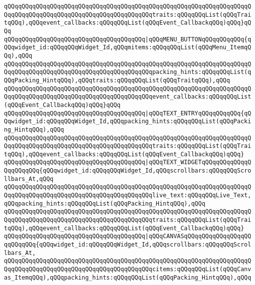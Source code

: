 \verb|qQQqqQQqqQQqqQQqqQQqqQQqqQQqqQQqqQQqqQQqqQQqqQQqqQQqqQQqqQQqqQQqqQQqqQQqqQQqqQQqqQQqqQQqqQQqqQQqqQQqqQQqqQQqqQQqtraits:qQQqqQQqList(qQQqTraitqQQq),qQQqevent_callbacks:qQQqqQQqList(qQQqEvent_CallbackqQQq)qQQq}qQQq|\newline
\verb|qQQqqQQqqQQqqQQqqQQqqQQqqQQqqQQqqQQqqQQq|\verb#|qQQqMENU_BUTTONqQQqqQQqqQQq{qQQqwidget_id:qQQqqQQqWidget_Id,qQQqmitems:qQQqqQQqList(qQQqMenu_ItemqQQq),qQQq#\newline
\verb|qQQqqQQqqQQqqQQqqQQqqQQqqQQqqQQqqQQqqQQqqQQqqQQqqQQqqQQqqQQqqQQqqQQqqQQqqQQqqQQqqQQqqQQqqQQqqQQqqQQqqQQqqQQqqQQqpacking_hints:qQQqqQQqList(qQQqPacking_HintqQQq),qQQqtraits:qQQqqQQqList(qQQqTraitqQQq),qQQq|\newline
\verb|qQQqqQQqqQQqqQQqqQQqqQQqqQQqqQQqqQQqqQQqqQQqqQQqqQQqqQQqqQQqqQQqqQQqqQQqqQQqqQQqqQQqqQQqqQQqqQQqqQQqqQQqqQQqqQQqevent_callbacks:qQQqqQQqList(qQQqEvent_CallbackqQQq)qQQq}qQQq|\newline
\verb|qQQqqQQqqQQqqQQqqQQqqQQqqQQqqQQqqQQqqQQq|\verb#|qQQqTEXT_ENTRYqQQqqQQqqQQq{qQQqwidget_id:qQQqqQQqWidget_Id,qQQqpacking_hints:qQQqqQQqList(qQQqPacking_HintqQQq),qQQq#\newline
\verb|qQQqqQQqqQQqqQQqqQQqqQQqqQQqqQQqqQQqqQQqqQQqqQQqqQQqqQQqqQQqqQQqqQQqqQQqqQQqqQQqqQQqqQQqqQQqqQQqqQQqqQQqqQQqqQQqtraits:qQQqqQQqList(qQQqTraitqQQq),qQQqevent_callbacks:qQQqqQQqList(qQQqEvent_CallbackqQQq)qQQq}|\newline
\verb|qQQqqQQqqQQqqQQqqQQqqQQqqQQqqQQqqQQqqQQq|\verb#|qQQqTEXT_WIDGETqQQqqQQqqQQqqQQqqQQqqQQq{qQQqwidget_id:qQQqqQQqWidget_Id,qQQqscrollbars:qQQqqQQqScrollbars_At,qQQq#\newline
\verb|qQQqqQQqqQQqqQQqqQQqqQQqqQQqqQQqqQQqqQQqqQQqqQQqqQQqqQQqqQQqqQQqqQQqqQQqqQQqqQQqqQQqqQQqqQQqqQQqqQQqqQQqqQQqqQQqlive_text:qQQqqQQqLive_Text,qQQqpacking_hints:qQQqqQQqList(qQQqPacking_HintqQQq),qQQq|\newline
\verb|qQQqqQQqqQQqqQQqqQQqqQQqqQQqqQQqqQQqqQQqqQQqqQQqqQQqqQQqqQQqqQQqqQQqqQQqqQQqqQQqqQQqqQQqqQQqqQQqqQQqqQQqqQQqqQQqtraits:qQQqqQQqList(qQQqTraitqQQq),qQQqevent_callbacks:qQQqqQQqList(qQQqEvent_CallbackqQQq)qQQq}|\newline
\verb|qQQqqQQqqQQqqQQqqQQqqQQqqQQqqQQqqQQqqQQq|\verb#|qQQqCANVASqQQqqQQqqQQqqQQqqQQqqQQqqQQq{qQQqwidget_id:qQQqqQQqWidget_Id,qQQqscrollbars:qQQqqQQqScrollbars_At,#\newline
\verb|qQQqqQQqqQQqqQQqqQQqqQQqqQQqqQQqqQQqqQQqqQQqqQQqqQQqqQQqqQQqqQQqqQQqqQQqqQQqqQQqqQQqqQQqqQQqqQQqqQQqqQQqqQQqqQQqcitems:qQQqqQQqList(qQQqCanvas_ItemqQQq),qQQqpacking_hints:qQQqqQQqList(qQQqPacking_HintqQQq),qQQq|\newline
